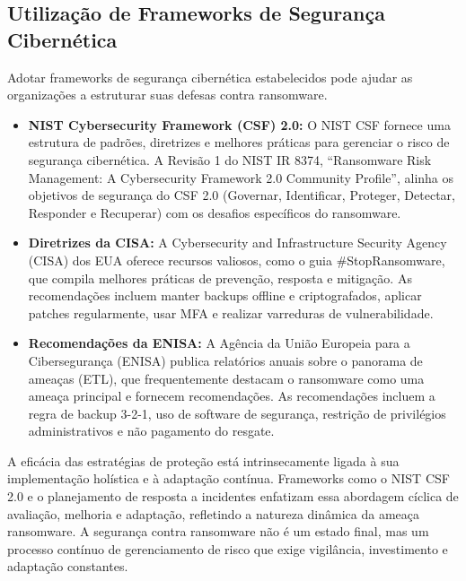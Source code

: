 \subsection{Utilização de Frameworks de Segurança Cibernética}
Adotar frameworks de segurança cibernética estabelecidos pode ajudar as organizações a estruturar suas defesas contra ransomware.
\begin{itemize}
    \item \textbf{NIST Cybersecurity Framework (CSF) 2.0:} O NIST CSF fornece uma estrutura de padrões, diretrizes e melhores práticas para gerenciar o risco de segurança cibernética. A Revisão 1 do NIST IR 8374, ``Ransomware Risk Management: A Cybersecurity Framework 2.0 Community Profile'', alinha os objetivos de segurança do CSF 2.0 (Governar, Identificar, Proteger, Detectar, Responder e Recuperar) com os desafios específicos do ransomware.
    \item \textbf{Diretrizes da CISA:} A Cybersecurity and Infrastructure Security Agency (CISA) dos EUA oferece recursos valiosos, como o guia \#StopRansomware, que compila melhores práticas de prevenção, resposta e mitigação. As recomendações incluem manter backups offline e criptografados, aplicar patches regularmente, usar MFA e realizar varreduras de vulnerabilidade.
    \item \textbf{Recomendações da ENISA:} A Agência da União Europeia para a Cibersegurança (ENISA) publica relatórios anuais sobre o panorama de ameaças (ETL), que frequentemente destacam o ransomware como uma ameaça principal e fornecem recomendações. As recomendações incluem a regra de backup 3-2-1, uso de software de segurança, restrição de privilégios administrativos e não pagamento do resgate.
\end{itemize}

A eficácia das estratégias de proteção está intrinsecamente ligada à sua implementação holística e à adaptação contínua. Frameworks como o NIST CSF 2.0 e o planejamento de resposta a incidentes enfatizam essa abordagem cíclica de avaliação, melhoria e adaptação, refletindo a natureza dinâmica da ameaça ransomware. A segurança contra ransomware não é um estado final, mas um processo contínuo de gerenciamento de risco que exige vigilância, investimento e adaptação constantes.

















